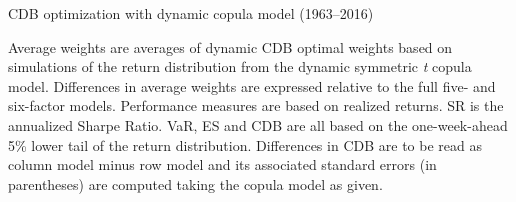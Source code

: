 
\begin{table}
  \centering
  \footnotesize
  \renewcommand{\arraystretch}{1.2}

  \caption{CDB optimization with dynamic copula model (1963--2016)}

  \begin{longcaption}
    Average weights are averages of dynamic CDB optimal weights based on simulations of the return distribution from the dynamic symmetric \emph{t} copula model. Differences in average weights are expressed relative to the full five- and six-factor models. Performance measures are based on realized returns. SR is the annualized Sharpe Ratio. VaR, ES and CDB are all based on the one-week-ahead 5\% lower tail of the return distribution. Differences in CDB are to be read as column model minus row model and its associated standard errors (in parentheses) are computed taking the copula model as given.
  \end{longcaption}

  \label{tab:cdb_model}


\end{table}
